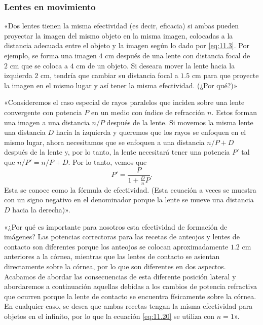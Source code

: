 \documentclass[12pt]{book}
\begin{document}
\subsubsection*{Lentes en movimiento}

«Dos lentes tienen la misma efectividad (es decir, eficacia) si ambas pueden proyectar la imagen del mismo objeto en la misma imagen, colocadas a la distancia adecuada entre el objeto y la imagen según lo dado por \eqref{eq:11.3}. Por ejemplo, se forma una imagen $4\text{ cm}$ después de una lente con distancia focal de $2\text{ cm}$ que se coloca a $4\text{ cm}$ de un objeto. Si deseara mover la lente hacia la izquierda $2\text{ cm}$, tendría que cambiar su distancia focal a $1.5\text{ cm}$ para que proyecte la imagen en el mismo lugar y así tener la misma efectividad. (¿Por qué?)»

«Consideremos el caso especial de rayos paralelos que inciden sobre una lente convergente con potencia $P$ en un medio con índice de refracción $n$. Estos forman una imagen a una distancia $n / P$ después de la lente. Si movemos la misma lente una distancia $D$ hacia la izquierda y queremos que los rayos se enfoquen en el mismo lugar, ahora necesitamos que se enfoquen a una distancia $n / P + D$ después de la lente y, por lo tanto, la lente necesitará tener una potencia $P'$ tal que $n / P' = n / P + D$. Por lo tanto, vemos que
\begin{equation}
P' = \frac{P}{1 + \frac{D}{n} P}. \label{eq:11.20}
\end{equation}
Esta se conoce como la fórmula de efectividad. (Esta ecuación a veces se muestra con un signo negativo en el denominador porque la lente se mueve una distancia $D$ hacia la derecha)».

«¿Por qué es importante para nosotros esta efectividad de formación de imágenes? Las potencias correctoras para las recetas de anteojos y lentes de contacto son diferentes porque los anteojos se colocan aproximadamente $1.2\text{ cm}$ anteriores a la córnea, mientras que las lentes de contacto se asientan directamente sobre la córnea, por lo que son diferentes en dos aspectos. Acabamos de abordar las consecuencias de esta diferente posición lateral y abordaremos a continuación aquellas debidas a los cambios de potencia refractiva que ocurren porque la lente de contacto se encuentra físicamente sobre la córnea. En cualquier caso, se desea que ambas recetas tengan la misma efectividad para objetos en el infinito, por lo que la ecuación \eqref{eq:11.20} se utiliza con $n = 1$».
\end{document}
